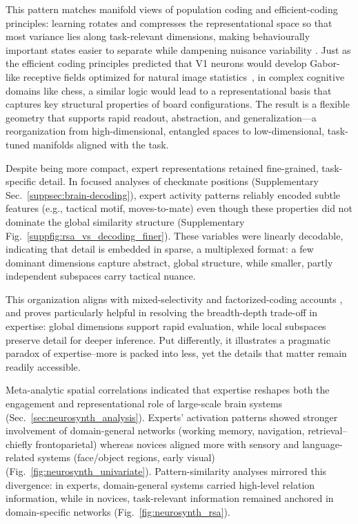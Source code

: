 \documentclass[preprint,12pt]{elsarticle}
\begin{document}
This pattern matches manifold views of population coding and efficient-coding principles: learning rotates and compresses the representational space so that most variance lies along task-relevant dimensions, making behaviourally important states easier to separate while dampening nuisance variability \cite{rigotti2013importance, chung2018classification, fusi2016neurons, barlow1961possible}. Just as the efficient coding principles predicted that V1 neurons would develop Gabor-like receptive fields optimized for natural image statistics~\cite{olshausen1996emergence,bell1997independent}, in complex cognitive domains like chess, a similar logic would lead to a representational basis that captures key structural properties of board configurations. The result is a flexible geometry that supports rapid readout, abstraction, and generalization—a reorganization from high-dimensional, entangled spaces to low-dimensional, task-tuned manifolds aligned with the task.

Despite being more compact, expert representations retained fine-grained, task-specific detail. In focused analyses of checkmate positions (Supplementary Sec.~\ref{suppsec:brain-decoding}), expert activity patterns reliably encoded subtle features (e.g., tactical motif, moves-to-mate) even though these properties did not dominate the global similarity structure (Supplementary Fig.~\ref{suppfig:rsa_vs_decoding_finer}). These variables were linearly decodable, indicating that detail is embedded in sparse, a multiplexed format: a few dominant dimensions capture abstract, global structure, while smaller, partly independent subspaces carry tactical nuance.

This organization aligns with mixed-selectivity and factorized-coding accounts \cite{fusi2016neurons,rigotti2013importance,yang2019task}, and proves particularly helpful in resolving the breadth-depth trade-off in expertise: global dimensions support rapid evaluation, while local subspaces preserve detail for deeper inference. Put differently, it illustrates a pragmatic paradox of expertise--more is packed into less, yet the details that matter remain readily accessible.

Meta-analytic spatial correlations indicated that expertise reshapes both the engagement and representational role of large-scale brain systems (Sec.~\ref{sec:neurosynth_analysis}). Experts' activation patterns showed stronger involvement of domain-general networks (working memory, navigation, retrieval--chiefly frontoparietal) whereas novices aligned more with sensory and language-related systems (face/object regions, early visual) (Fig.~\ref{fig:neurosynth_univariate}). Pattern-similarity analyses mirrored this divergence: in experts, domain-general systems carried high-level relation information, while in novices, task-relevant information remained anchored in domain-specific networks (Fig.~\ref{fig:neurosynth_rsa}).
\end{document}

